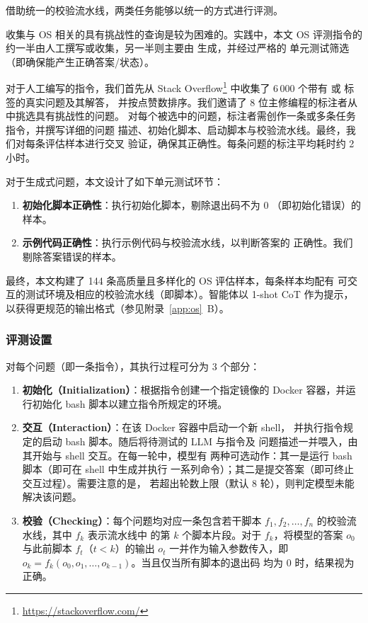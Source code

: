 借助统一的校验流水线，两类任务能够以统一的方式进行评测。

收集与 OS 相关的具有挑战性的查询是较为困难的。实践中，本文 OS 评测指令的
约一半由人工撰写或收集，另一半则主要由  生成，并经过严格的
单元测试筛选（即确保能产生正确答案/状态）。

对于人工编写的指令，我们首先从 Stack Overflow\footnote{\url{https://stackoverflow.com/}}
中收集了 6\,000 个带有  或  标签的真实问题及其解答，
并按点赞数排序。我们邀请了 8 位主修编程的标注者从中挑选具有挑战性的问题。
对每个被选中的问题，标注者需创作一条或多条任务指令，并撰写详细的问题
描述、初始化脚本、启动脚本与校验流水线。最终，我们对每条评估样本进行交叉
验证，确保其正确性。每条问题的标注平均耗时约 2 小时。

对于生成式问题，本文设计了如下单元测试环节：
\begin{enumerate}
    \item \textbf{初始化脚本正确性}：执行初始化脚本，剔除退出码不为 0
          （即初始化错误）的样本。
    \item \textbf{示例代码正确性}：执行示例代码与校验流水线，以判断答案的
          正确性。我们剔除答案错误的样本。
\end{enumerate}

最终，本文构建了 144 条高质量且多样化的 OS 评估样本，每条样本均配有
可交互的测试环境及相应的校验流水线（即脚本）。智能体以 1-shot CoT
作为提示，以获得更规范的输出格式（参见附录~\ref{app:os}~B）。

\subsubsection*{评测设置}

对每个问题（即一条指令），其执行过程可分为 3 个部分：
\begin{enumerate}
    \item \textbf{初始化（Initialization）}：根据指令创建一个指定镜像的
          Docker 容器，并运行初始化 bash 脚本以建立指令所规定的环境。
    \item \textbf{交互（Interaction）}：在该 Docker 容器中启动一个新 shell，
          并执行指令规定的启动 bash 脚本。随后将待测试的 LLM 与指令及
          问题描述一并喂入，由其开始与 shell 交互。在每一轮中，模型有
          两种可选动作：其一是运行 bash 脚本（即可在 shell 中生成并执行
          一系列命令）；其二是提交答案（即可终止交互过程）。需要注意的是，
          若超出轮数上限（默认 8 轮），则判定模型未能解决该问题。
    \item \textbf{校验（Checking）}：每个问题均对应一条包含若干脚本
          $f_1, f_2, \dots, f_n$ 的校验流水线，其中 $f_k$ 表示流水线中
          的第 $k$ 个脚本片段。对于 $f_k$，将模型的答案 $o_0$ 与此前脚本
          $f_t$（$t<k$）的输出 $o_t$ 一并作为输入参数传入，即
          $o_k = f_k(o_0, o_1, \dots, o_{k-1})$。当且仅当所有脚本的退出码
          均为 0 时，结果视为正确。
\end{enumerate}

